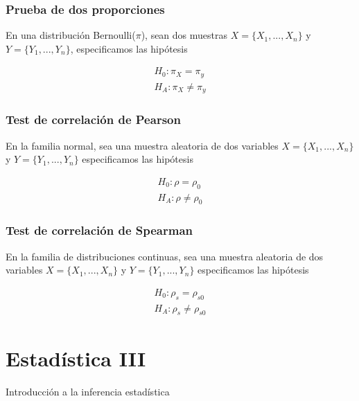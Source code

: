 \documentclass[
  letterpaper,
  DIV=11,
  numbers=noendperiod]{scrreprt}
\begin{document}
\subsection{Prueba de dos
proporciones}\label{prueba-de-dos-proporciones}

En una distribución Bernoulli(\(\pi\)), sean dos muestras
\(X = \{X_1, ... , X_n\}\) y \(Y = \{Y_1, ... , Y_n\}\), especificamos
las hipótesis

\[
\begin{align*}
  H_0: \pi_X = \pi_y\\
  H_A: \pi_X \neq \pi_y
\end{align*}
\]

\subsection{Test de correlación de
Pearson}\label{test-de-correlaciuxf3n-de-pearson}

En la familia normal, sea una muestra aleatoria de dos variables
\(X = \{X_1, ... , X_n\}\) y \(Y = \{Y_1, ... , Y_n\}\) especificamos
las hipótesis

\[
\begin{align*}
H_0: \rho =   \rho_0\\
H_A: \rho \neq   \rho_0
\end{align*}
\]

\subsection{Test de correlación de
Spearman}\label{test-de-correlaciuxf3n-de-spearman}

En la familia de distribuciones continuas, sea una muestra aleatoria de
dos variables \(X = \{X_1, ... , X_n\}\) y \(Y = \{Y_1, ... , Y_n\}\)
especificamos las hipótesis

\[
\begin{align*}
H_0: \rho_s =   \rho_{s0}\\
H_A: \rho_s \neq   \rho_{s0}
\end{align*}
\]


\chapter{Estadística III}\label{estaduxedstica-iii}

Introducción a la inferencia estadística

\hfill\break
\end{document}
